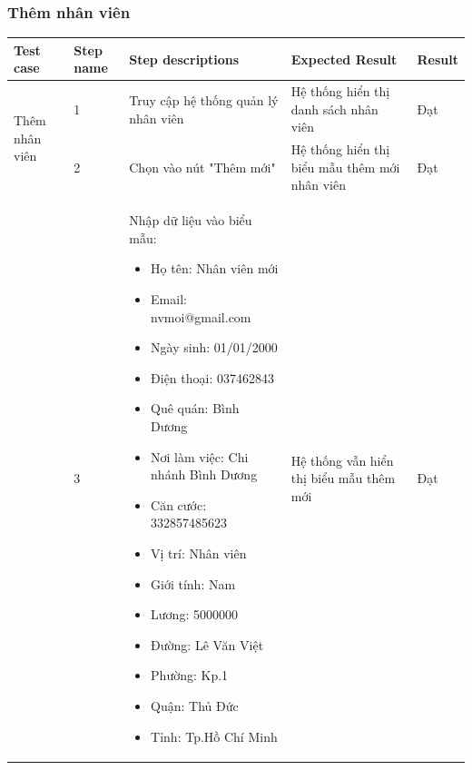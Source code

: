 \subsubsection{Thêm nhân viên}
{
    \setlength\extrarowheight{6pt}
    \begin{longtable}{| p{2.5cm}| p{1cm}| p{5.5cm}| p{4.5cm} | p{1.5cm} |}
        \hline
        \textbf{Test case}                         & \textbf{Step name}                             & \textbf{Step descriptions}          & \textbf{Expected Result}                      & \textbf{Result} \\
        \hline
        \multirow[t]{2}{2.5cm}{Thêm nhân viên}     & 1                                              & Truy cập hệ thống quản lý nhân viên & Hệ thống hiển thị danh sách nhân viên         & Đạt             \\
        \cline{2-5}
                                                   & 2                                              & Chọn vào nút "Thêm mới"             & Hệ thống hiển thị biểu mẫu thêm mới nhân viên & Đạt             \\
        \cline{2-5}
                                                   & 3                                              & Nhập dữ liệu vào biểu mẫu:
        \begin{itemize}
            \item Họ tên: Nhân viên mới
            \item Email: nvmoi@gmail.com
            \item Ngày sinh: 01/01/2000
            \item Điện thoại: 037462843
            \item Quê quán: Bình Dương
            \item Nơi làm việc: Chi nhánh Bình Dương
            \item Căn cước: 332857485623
            \item Vị trí: Nhân viên
            \item Giới tính: Nam
            \item Lương: 5000000
            \item Đường: Lê Văn Việt
            \item Phường: Kp.1
            \item Quận: Thủ Đức
            \item Tỉnh: Tp.Hồ Chí Minh
        \end{itemize}   & Hệ thống vẫn hiển thị biểu mẫu thêm mới        & Đạt                                                                                                                              \\

\end{longtable}}
